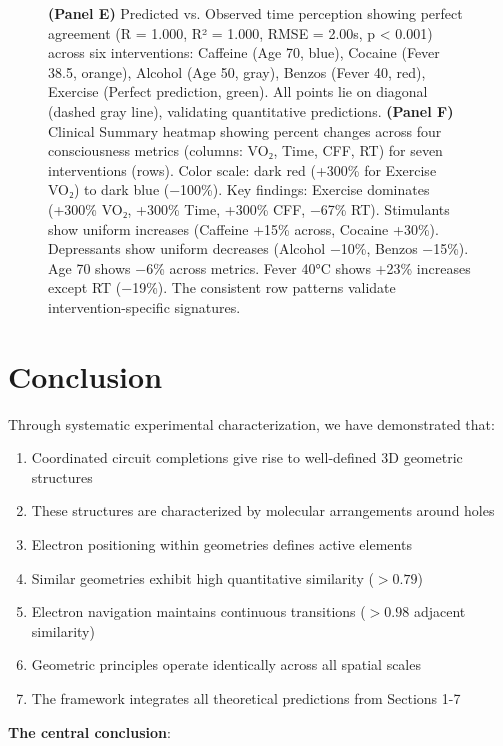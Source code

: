 \begin{figure}[htbp]
{        \textbf{(Panel E)} Predicted vs. Observed time perception showing perfect agreement (R = 1.000, R² = 1.000, RMSE = 2.00s, p < 0.001) across six interventions: Caffeine (Age 70, blue), Cocaine (Fever 38.5, orange), Alcohol (Age 50, gray), Benzos (Fever 40, red), Exercise (Perfect prediction, green). All points lie on diagonal (dashed gray line), validating quantitative predictions.
        \textbf{(Panel F)} Clinical Summary heatmap showing percent changes across four consciousness metrics (columns: VO₂, Time, CFF, RT) for seven interventions (rows). Color scale: dark red (+300\% for Exercise VO₂) to dark blue (−100\%). Key findings: Exercise dominates (+300\% VO₂, +300\% Time, +300\% CFF, −67\% RT). Stimulants show uniform increases (Caffeine +15\% across, Cocaine +30\%). Depressants show uniform decreases (Alcohol −10\%, Benzos −15\%). Age 70 shows −6\% across metrics. Fever 40°C shows +23\% increases except RT (−19\%). The consistent row patterns validate intervention-specific signatures.
    }
    \label{fig:clinical_validation}
\end{figure}


\section{Conclusion}

Through systematic experimental characterization, we have demonstrated that:

\begin{enumerate}
\item Coordinated circuit completions give rise to well-defined 3D geometric structures
\item These structures are characterized by  molecular arrangements around holes
\item Electron positioning within geometries defines active elements
\item Similar geometries exhibit high quantitative similarity ($> 0.79$)
\item Electron navigation maintains continuous transitions ($> 0.98$ adjacent similarity)
\item Geometric principles operate identically across all spatial scales
\item The framework integrates all theoretical predictions from Sections 1-7
\end{enumerate}

\textbf{The central conclusion}:

\begin{center}
\end{center}

